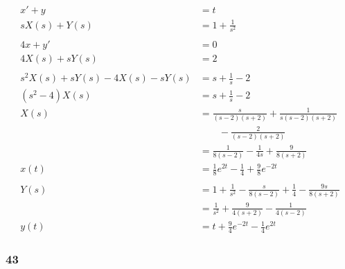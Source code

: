 \documentclass{article}
\begin{document}
\begin{align*}
  x' + y                              & = t                                                                             \\
  s X(s) + Y(s)                       & = 1 + \frac{1}{s^2}                                                             \\ \\
  4 x + y'                            & = 0                                                                             \\
  4 X(s) + s Y(s)                     & = 2                                                                             \\ \\
  s^2 X(s) + s Y(s) - 4 X(s) - s Y(s) & = s + \frac{1}{s} - 2                                                           \\
  (s^2 - 4) X(s)                      & = s + \frac{1}{s} - 2                                                           \\
  X(s)                                & = \frac{s}{(s - 2) (s + 2)} + \frac{1}{s (s - 2) (s + 2)}                       \\
                                      & \qquad - \frac{2}{(s - 2) (s + 2)}                                              \\
                                      & = \frac{1}{8 (s - 2)} - \frac{1}{4 s} + \frac{9}{8 (s + 2)}                     \\
  x(t)                                & = \frac{1}{8} e^{2 t} - \frac{1}{4} + \frac{9}{8} e^{-2 t}                      \\ \\
  Y(s)                                & = 1 + \frac{1}{s^2} - \frac{s}{8 (s - 2)} + \frac{1}{4} - \frac{9 s}{8 (s + 2)} \\
                                      & = \frac{1}{s^2} + \frac{9}{4 (s + 2)} - \frac{1}{4 (s - 2)}                     \\
  y(t)                                & = t + \frac{9}{4} e^{-2 t} - \frac{1}{4} e^{2 t}
\end{align*}

\subsubsection{43}
\end{document}
